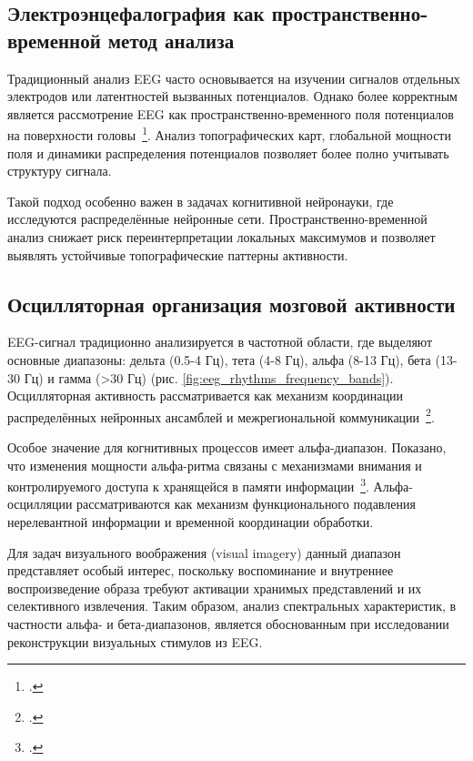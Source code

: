 \subsection{Электроэнцефалография как пространственно-временной метод анализа}

Традиционный анализ EEG часто основывается на изучении сигналов отдельных электродов или латентностей вызванных потенциалов. Однако более корректным является рассмотрение EEG как пространственно-временного поля потенциалов на поверхности головы~\footcite{10.1016/j.neuroimage.2011.12.039}. Анализ топографических карт, глобальной мощности поля и динамики распределения потенциалов позволяет более полно учитывать структуру сигнала.

Такой подход особенно важен в задачах когнитивной нейронауки, где исследуются распределённые нейронные сети. Пространственно-временной анализ снижает риск переинтерпретации локальных максимумов и позволяет выявлять устойчивые топографические паттерны активности.

\subsection{Осцилляторная организация мозговой активности}

EEG-сигнал традиционно анализируется в частотной области, где выделяют основные диапазоны: дельта (0.5-4 Гц), тета (4-8 Гц), альфа (8-13 Гц), бета (13-30 Гц) и гамма (>30 Гц) (рис. \ref{fig:eeg_rhythms_frequency_bands}). Осцилляторная активность рассматривается как механизм координации распределённых нейронных ансамблей и межрегиональной коммуникации~\footcite{10.1016/s0167-8760-99-00047-1}.

Особое значение для когнитивных процессов имеет альфа-диапазон. Показано, что изменения мощности альфа-ритма связаны с механизмами внимания и контролируемого доступа к хранящейся в памяти информации~\footcite{10.1016/j.tics.2012.10.007}. Альфа-осцилляции рассматриваются как механизм функционального подавления нерелевантной информации и временной координации обработки.

Для задач визуального воображения (visual imagery) данный диапазон представляет особый интерес, поскольку воспоминание и внутреннее воспроизведение образа требуют активации хранимых представлений и их селективного извлечения. Таким образом, анализ спектральных характеристик, в частности альфа- и бета-диапазонов, является обоснованным при исследовании реконструкции визуальных стимулов из EEG.

